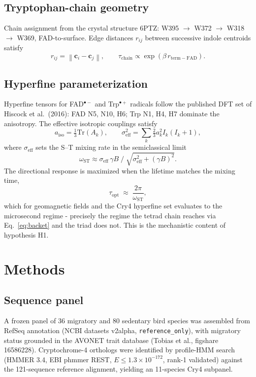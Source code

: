 \documentclass[12pt,a4paper]{article}
\begin{document}
\subsection{Tryptophan-chain geometry}
Chain assignment from the crystal structure 6PTZ: W395 $\to$ W372 $\to$ W318 $\to$ W369, FAD-to-surface. Edge distances $r_{ij}$ between successive indole centroids satisfy
\begin{equation}
r_{ij} = \left\| \mathbf{c}_i - \mathbf{c}_j \right\|, \qquad \tau_{\mathrm{chain}} \propto \exp(\beta\, r_{\mathrm{term-FAD}}). \label{eq:chain}
\end{equation}


\subsection{Hyperfine parameterization}
Hyperfine tensors for FAD$^{\bullet-}$ and Trp$^{\bullet+}$ radicals follow the published DFT set of Hiscock et al.\ (2016): FAD N5, N10, H6; Trp N1, H4, H7 dominate the anisotropy. The effective isotropic couplings satisfy
\begin{equation}
a_{\mathrm{iso}} = \tfrac{1}{3}\mathrm{Tr}(A_k), \qquad
\sigma_{\mathrm{eff}}^2 = \sum_k \tfrac{2}{3} a_k^2 I_k(I_k+1), \label{eq:sigeff}
\end{equation}
where $\sigma_{\mathrm{eff}}$ sets the S--T mixing rate in the semiclassical limit
\begin{equation}
\omega_{\mathrm{ST}} \approx \sigma_{\mathrm{eff}}\, \gamma B \;/\; \sqrt{\sigma_{\mathrm{eff}}^2 + (\gamma B)^2}. \label{eq:omst}
\end{equation}
The directional response is maximized when the lifetime matches the mixing time,
\begin{equation}
\tau_{\mathrm{opt}} \;\approx\; \frac{2\pi}{\omega_{\mathrm{ST}}}, \label{eq:tauopt}
\end{equation}
which for geomagnetic fields and the Cry4 hyperfine set evaluates to the microsecond regime - precisely the regime the tetrad chain reaches via Eq.~\eqref{eq:backet} and the triad does not. This is the mechanistic content of hypothesis H1.

\section{Methods}
\subsection{Sequence panel}
A frozen panel of 36 migratory and 80 sedentary bird species was assembled from RefSeq annotation (NCBI datasets v2alpha, \texttt{reference\_only}), with migratory status grounded in the AVONET trait database (Tobias et al., figshare 16586228). Cryptochrome-4 orthologs were identified by profile-HMM search (HMMER 3.4, EBI phmmer REST, $E \leq 1.3\times10^{-172}$, rank-1 validated) against the 121-sequence reference alignment, yielding an 11-species Cry4 subpanel.
\end{document}
